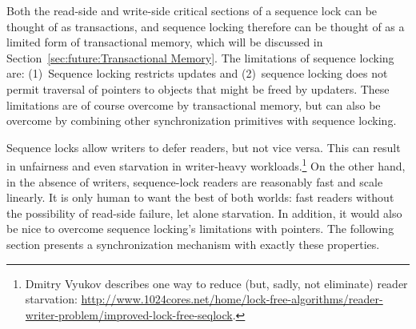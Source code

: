 Both the read-side and write-side critical sections of a sequence lock
can be thought of as transactions, and sequence locking therefore
can be thought of as a limited form of transactional memory, which
will be discussed in Section~\ref{sec:future:Transactional Memory}.
The limitations of sequence locking are: (1)~Sequence locking restricts
updates and (2)~sequence locking does not permit traversal of pointers
to objects that might be freed by updaters.
These limitations are of course overcome by transactional memory, but
can also be overcome by combining other synchronization primitives
with sequence locking.

Sequence locks allow writers to defer readers, but not vice versa.
This can result in unfairness and even starvation
in writer-heavy workloads.\footnote{
	Dmitry Vyukov describes one way to reduce (but, sadly, not eliminate)
	reader starvation:
	\url{http://www.1024cores.net/home/lock-free-algorithms/reader-writer-problem/improved-lock-free-seqlock}.}
On the other hand, in the absence of writers, sequence-lock readers are
reasonably fast and scale linearly.
It is only human to want the best of both worlds: fast readers without
the possibility of read-side failure, let alone starvation.
In addition, it would also be nice to overcome sequence locking's limitations
with pointers.
The following section presents a synchronization mechanism with exactly
these properties.
